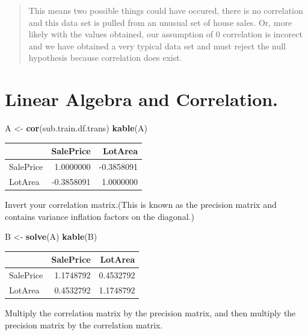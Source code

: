 \documentclass[]{article}
\newenvironment{Shaded}{\begin{snugshade}}{\end{snugshade}}
\newcommand{\KeywordTok}[1]{\textcolor[rgb]{0.13,0.29,0.53}{\textbf{{#1}}}}
\newcommand{\StringTok}[1]{\textcolor[rgb]{0.31,0.60,0.02}{{#1}}}
\newcommand{\NormalTok}[1]{{#1}}
\begin{document}
\begin{quote}
This means two possible things could have occured, there is no
correlation and this data set is pulled from an unusual set of house
sales. Or, more likely with the values obtained, our assumption of 0
correlation is incorect and we have obtained a very typical data set and
must reject the null hypothesis because correlation does exist.
\end{quote}

\section{Linear Algebra and
Correlation.}\label{linear-algebra-and-correlation.}

\begin{Shaded}
\begin{Highlighting}[]
\NormalTok{A <-}\StringTok{ }\KeywordTok{cor}\NormalTok{(sub.train.df.trans)}
\KeywordTok{kable}\NormalTok{(A)}
\end{Highlighting}
\end{Shaded}

\begin{longtable}[]{@{}lrr@{}}
\toprule
& SalePrice & LotArea\tabularnewline
\midrule
\endhead
SalePrice & 1.0000000 & -0.3858091\tabularnewline
LotArea & -0.3858091 & 1.0000000\tabularnewline
\bottomrule
\end{longtable}

Invert your correlation matrix.(This is known as the precision matrix
and contains variance inflation factors on the diagonal.)

\begin{Shaded}
\begin{Highlighting}[]
\NormalTok{B <-}\StringTok{ }\KeywordTok{solve}\NormalTok{(A)}
\KeywordTok{kable}\NormalTok{(B)}
\end{Highlighting}
\end{Shaded}

\begin{longtable}[]{@{}lrr@{}}
\toprule
& SalePrice & LotArea\tabularnewline
\midrule
\endhead
SalePrice & 1.1748792 & 0.4532792\tabularnewline
LotArea & 0.4532792 & 1.1748792\tabularnewline
\bottomrule
\end{longtable}

Multiply the correlation matrix by the precision matrix, and then
multiply the precision matrix by the correlation matrix.

\begin{Shaded}
\end{Shaded}
\end{document}
